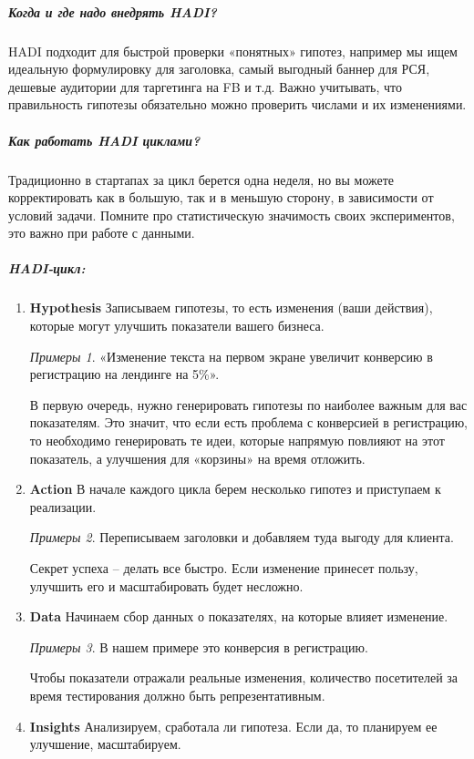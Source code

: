 \documentclass[11pt]{article}
\theoremstyle{plain} %
\theoremstyle{definition} %
\theoremstyle{remark} %
\newtheorem*{nonum}{Примеры}
\begin{document}
\subparagraph{Когда и где надо внедрять HADI?}

HADI подходит для быстрой проверки «понятных» гипотез, например мы ищем идеальную формулировку для заголовка, самый выгодный баннер для РСЯ, дешевые аудитории для таргетинга на FB и т.д. Важно учитывать, что правильность гипотезы обязательно можно проверить числами и их изменениями.

\subparagraph{Как работать HADI циклами?}

Традиционно в стартапах за цикл берется одна неделя, но вы можете корректировать как в большую, так и в меньшую сторону, в зависимости от условий задачи. Помните про статистическую значимость своих экспериментов, это важно при работе с данными.

\subparagraph{HADI-цикл:}

\begin{enumerate}
	\item \textbf{Hypothesis} Записываем гипотезы, то есть изменения (ваши действия), которые могут улучшить показатели вашего бизнеса.
	\begin{nonum}
		«Изменение текста на первом экране увеличит конверсию в регистрацию на лендинге на 5\%».
	\end{nonum}
	В первую очередь, нужно генерировать гипотезы по наиболее важным для вас показателям. Это значит, что если есть проблема с конверсией в регистрацию, то необходимо генерировать те идеи, которые напрямую повлияют на этот показатель, а улучшения для «корзины» на время отложить.
	\item \textbf{Action} В начале каждого цикла берем несколько гипотез и приступаем к реализации.
	\begin{nonum}
		Переписываем заголовки и добавляем туда выгоду для клиента.
	\end{nonum}
	Секрет успеха – делать все быстро. Если изменение принесет пользу, улучшить его и масштабировать будет несложно.
	\item \textbf{Data} Начинаем сбор данных о показателях, на которые влияет изменение.
	\begin{nonum}
		В нашем примере это конверсия в регистрацию.
	\end{nonum}
	Чтобы показатели отражали реальные изменения, количество посетителей за время тестирования должно быть репрезентативным.
	\item \textbf{Insights} Анализируем, сработала ли гипотеза. Если да, то планируем ее улучшение, масштабируем.
\end{enumerate}
\end{document}
